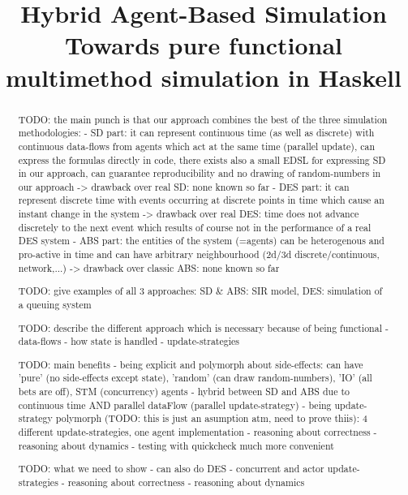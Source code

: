 \documentclass[10pt, onecolumn, conference]{../../../templates/IEEEtran/IEEEtran}
\title{Hybrid Agent-Based Simulation \\ {\large Towards pure functional multimethod simulation in Haskell}}
\author{
	\IEEEauthorblockN{Jonathan Thaler}
	\IEEEauthorblockA{School of Computer Science\\
		University of Nottingham\\
		jonathan.thaler@nottingham.ac.uk}
		
	\and
		
	\IEEEauthorblockN{Peer-Olaf Siebers}
	\IEEEauthorblockA{School of Computer Science\\
		University of Nottingham\\
		peer-olaf.siebers@nottingham.ac.uk}
}
\begin{document}
\maketitle 

\begin{abstract}
TODO: the main punch is that our approach combines the best of the three simulation methodologies:
	- SD part: 	it can represent continuous time (as well as discrete) with continuous data-flows from agents which act at the same time (parallel update), can express the formulas directly in code, there exists also a small EDSL for expressing SD in our approach, can guarantee reproducibility and no drawing of random-numbers in our approach
		-> drawback over real SD: none known so far 
	- DES part: it can represent discrete time with events occurring at discrete points in time which cause an instant change in the system
		-> drawback over real DES: time does not advance discretely to the next event which results of course not in the performance of a real DES system
	- ABS part:	the entities of the system (=agents) can be heterogenous and pro-active in time and can have arbitrary neighbourhood (2d/3d discrete/continuous, network,...)
		-> drawback over classic ABS: none known so far 

TODO: give examples of all 3 approaches: SD \& ABS: SIR model, DES: simulation of a queuing system

TODO: describe the different approach which is necessary because of being functional 
	- data-flows
	- how state is handled
	- update-strategies

TODO: main benefits
	- being explicit and polymorph about side-effects: can have 'pure' (no side-effects except state), 'random' (can draw random-numbers), 'IO' (all bets are off), STM (concurrency) agents
	- hybrid between SD and ABS due to continuous time AND parallel dataFlow (parallel update-strategy)
	- being update-strategy polymorph (TODO: this is just an asumption atm, need to prove thiis): 4 different update-strategies, one agent implementation
	- reasoning about correctness
	- reasoning about dynamics 
	- testing with quickcheck much more convenient
	
TODO: what we need to show 
	- can also do DES
	- concurrent and actor update-strategies
	- reasoning about correctness
	- reasoning about dynamics
	

\end{abstract}
\end{document}
